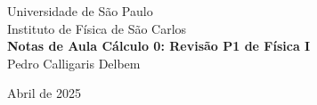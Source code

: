 \documentclass[12pt, a4paper]{article} %
\begin{document}
	
	\begin{titlepage}
		\begin{center}
\Huge{Universidade de São Paulo}\\
\large{Instituto de Física de São Carlos}\\
\vspace{20pt}
\vspace{200pt}
\textbf{Notas de Aula C\'alculo 0: Revis\~ao P1 de F\'isica I}\\
\vspace{2cm}
Pedro Calligaris Delbem\\
\end{center}

		\begin{center}
			\vspace{\fill}
	Abril de 2025	
		\end{center}
	\end{titlepage}

	\tableofcontents 
	\thispagestyle{empty}
	\newpage
\end{document}
